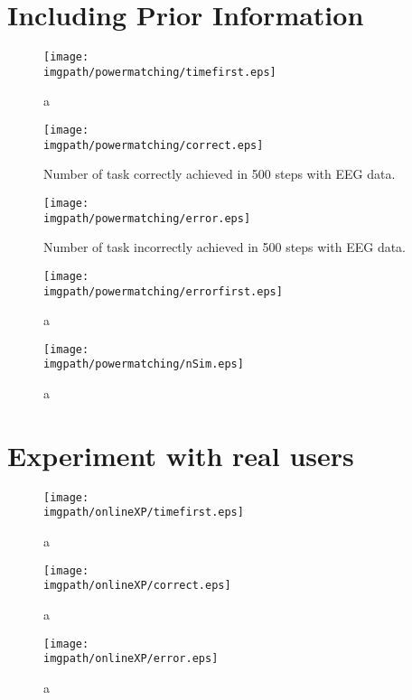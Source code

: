 \section{Including Prior Information}


\begin{figure}[!ht]
\centering
\texttt{[image: \\imgpath/powermatching/timefirst.eps]}
\caption{a}
\label{fig:timefirst_powermatching}
\end{figure} 

\begin{figure}[!ht]
\centering
\texttt{[image: \\imgpath/powermatching/correct.eps]}
\caption{Number of task correctly achieved in 500 steps with EEG data.}
\label{fig:nCorrect_powermatching}
\end{figure} 

\begin{figure}[!ht]
\centering
\texttt{[image: \\imgpath/powermatching/error.eps]}
\caption{Number of task incorrectly achieved in 500 steps with EEG data.}
\label{fig:nWrongEEG_powermatching}
\end{figure} 


\begin{figure}[!ht]
\centering
\texttt{[image: \\imgpath/powermatching/errorfirst.eps]}
\caption{a}
\label{fig:errorfirst_powermatching}
\end{figure} 


\begin{figure}[!ht]
\centering
\texttt{[image: \\imgpath/powermatching/nSim.eps]}
\caption{a}
\label{fig:nSim_powermatching}
\end{figure} 


\section{Experiment with real users}

\begin{figure}[!ht]
\centering
\texttt{[image: \\imgpath/onlineXP/timefirst.eps]}
\caption{a}
\label{fig:timefirst_online}
\end{figure} 


\begin{figure}[!ht]
\centering
\texttt{[image: \\imgpath/onlineXP/correct.eps]}
\caption{a}
\label{fig:correct_online}
\end{figure} 

\begin{figure}[!ht]
\centering
\texttt{[image: \\imgpath/onlineXP/error.eps]}
\caption{a}
\label{fig:error_online}
\end{figure} 
